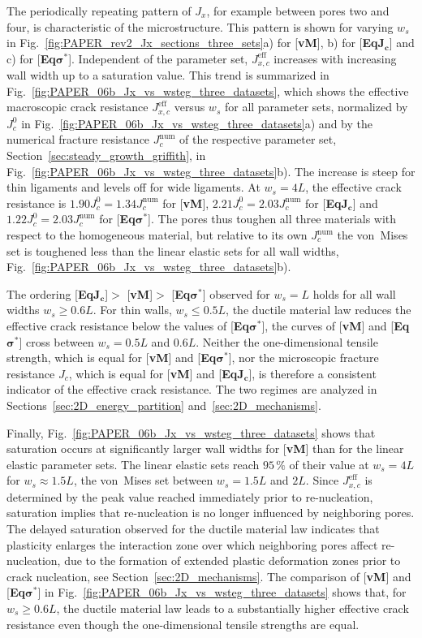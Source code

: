 \documentclass[pdflatex,sn-mathphys-num]{sn-jnl}%
\newcommand{\vMLabel}{[\textbf{vM}]\xspace}
\newcommand{\EqJcLabel}{[\textbf{Eq$\boldsymbol{J_c}$}]\xspace}
\newcommand{\EqSigmaStarLabel}{[\textbf{Eq$\boldsymbol{\sigma^*}$}]\xspace}
\theoremstyle{thmstyleone}%
\theoremstyle{thmstyletwo}%
\theoremstyle{thmstylethree}%
\begin{document}
The periodically repeating pattern of $J_x$, for example between pores two and four, is characteristic of the microstructure. This pattern is shown for varying $w_s$ in Fig.~\ref{fig:PAPER_rev2_Jx_sections_three_sets}a) for \vMLabel, b) for \EqJcLabel and c) for \EqSigmaStarLabel. Independent of the parameter set, $J_{x,c}^{\text{eff}}$ increases with increasing wall width up to a saturation value. This trend is summarized in Fig.~\ref{fig:PAPER_06b_Jx_vs_wsteg_three_datasets}, which shows the effective macroscopic crack resistance $J_{x,c}^{\text{eff}}$ versus $w_s$ for all parameter sets, normalized by $J_c^0$ in Fig.~\ref{fig:PAPER_06b_Jx_vs_wsteg_three_datasets}a) and by the numerical fracture resistance $J_c^{\text{num}}$ of the respective parameter set, Section~\ref{sec:steady_growth_griffith}, in Fig.~\ref{fig:PAPER_06b_Jx_vs_wsteg_three_datasets}b). The increase is steep for thin ligaments and levels off for wide ligaments. At $w_s = 4L$, the effective crack resistance is $1.90J_c^0 = 1.34J_c^{\text{num}}$ for \vMLabel, $2.21J_c^0 = 2.03J_c^{\text{num}}$ for \EqJcLabel and $1.22J_c^0 = 2.03J_c^{\text{num}}$ for \EqSigmaStarLabel. The pores thus toughen all three materials with respect to the homogeneous material, but relative to its own $J_c^{\text{num}}$ the von~Mises set is toughened less than the linear elastic sets for all wall widths, Fig.~\ref{fig:PAPER_06b_Jx_vs_wsteg_three_datasets}b).

The ordering \EqJcLabel $>$ \vMLabel $>$ \EqSigmaStarLabel observed for $w_s = L$ holds for all wall widths $w_s \ge 0.6L$. For thin walls, $w_s \le 0.5L$, the ductile material law reduces the effective crack resistance below the values of \EqSigmaStarLabel, the curves of \vMLabel and \EqSigmaStarLabel cross between $w_s = 0.5L$ and $0.6L$. Neither the one-dimensional tensile strength, which is equal for \vMLabel and \EqSigmaStarLabel, nor the microscopic fracture resistance $J_c$, which is equal for \vMLabel and \EqJcLabel, is therefore a consistent indicator of the effective crack resistance. The two regimes are analyzed in Sections~\ref{sec:2D_energy_partition} and~\ref{sec:2D_mechanisms}.

Finally, Fig.~\ref{fig:PAPER_06b_Jx_vs_wsteg_three_datasets} shows that saturation occurs at significantly larger wall widths for \vMLabel than for the linear elastic parameter sets. The linear elastic sets reach $95\,\%$ of their value at $w_s = 4L$ for $w_s \approx 1.5L$, the von~Mises set between $w_s = 1.5L$ and $2L$. Since $J_{x,c}^{\text{eff}}$ is determined by the peak value reached immediately prior to re-nucleation, saturation implies that re-nucleation is no longer influenced by neighboring pores. The delayed saturation observed for the ductile material law indicates that plasticity enlarges the interaction zone over which neighboring pores affect re-nucleation, due to the formation of extended plastic deformation zones prior to crack nucleation, see Section~\ref{sec:2D_mechanisms}.
The comparison of \vMLabel and \EqSigmaStarLabel in Fig.~\ref{fig:PAPER_06b_Jx_vs_wsteg_three_datasets} shows that, for $w_s \ge 0.6L$, the ductile material law leads to a substantially higher effective crack resistance even though the one-dimensional tensile strengths are equal.
\end{document}
